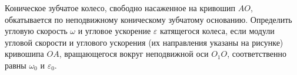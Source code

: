 Коническое зубчатое колесо, свободно насаженное на кривошип $AO$,
обкатывается по неподвижному коническому зубчатому основанию.
Определить угловую скорость $\omega$ и угловое ускорение $\varepsilon$
катящегося колеса, если модули угловой скорости и углового ускорения
(их направления указаны на рисунке) кривошипа $OA$,
вращающегося вокруг неподвижной оси $O_1O$, соответственно равны
$\omega _0$ и $\varepsilon _0$.
